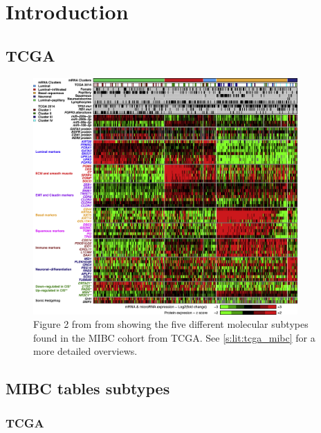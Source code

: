 \chapter{Introduction} \label{s:ap:intro}

\section{TCGA}

\begin{figure}[!htb]    
    \centering
\includegraphics[width=0.9\textwidth,height=0.9\textheight,keepaspectratio]{Sections/Lit_review/Resources/TCGA_2017_subtypes.jpg}
    \caption{Figure 2 from from \cite{Robertson2017-mg} showing the five different molecular subtypes found in the MIBC cohort from TCGA. See \cref{s:lit:tcga_mibc} for a more detailed overviews.}
    \label{fig:ap:tcga_subtypes}
\end{figure}

\section{MIBC tables subtypes}

\subsection{TCGA}

\newpage


